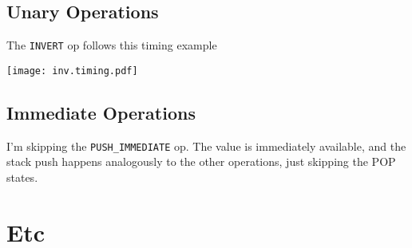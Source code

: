 \documentclass{article}
\begin{document}

%
%

\subsection{Unary Operations}
The \verb'INVERT' op follows this timing example
\begin{center}
\texttt{[image: inv.timing.pdf]}
\end{center}

\subsection{Immediate Operations}
I'm skipping the \verb'PUSH_IMMEDIATE' op. The value is immediately available, and the stack push happens analogously to the other operations, just skipping the POP states.

\section{Etc}
\end{document}
